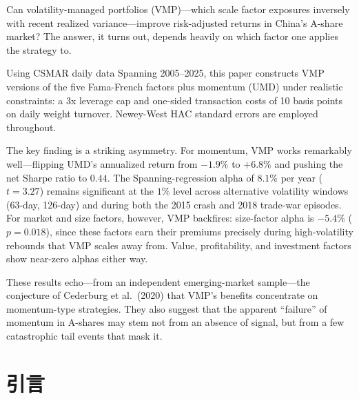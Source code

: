 \documentclass[
    decl-page,
    oneside,
  ]{njuthesis}
\begin{document}
\begin{abstract*}

Can volatility-managed portfolios (VMP)---which scale factor exposures inversely with recent realized variance---improve risk-adjusted returns in China's A-share market? The answer, it turns out, depends heavily on which factor one applies the strategy to.

Using CSMAR daily data Spanning 2005--2025, this paper constructs VMP versions of the five Fama-French factors plus momentum (UMD) under realistic constraints: a 3x leverage cap and one-sided transaction costs of 10 basis points on daily weight turnover. Newey-West HAC standard errors are employed throughout.

The key finding is a striking asymmetry. For momentum, VMP works remarkably well---flipping UMD's annualized return from $-1.9\%$ to $+6.8\%$ and pushing the net Sharpe ratio to $0.44$. The Spanning-regression alpha of $8.1\%$ per year ($t = 3.27$) remains significant at the $1\%$ level across alternative volatility windows (63-day, 126-day) and during both the 2015 crash and 2018 trade-war episodes. For market and size factors, however, VMP backfires: size-factor alpha is $-5.4\%$ ($p = 0.018$), since these factors earn their premiums precisely during high-volatility rebounds that VMP scales away from. Value, profitability, and investment factors show near-zero alphas either way.

These results echo---from an independent emerging-market sample---the conjecture of Cederburg et al.\ (2020) that VMP's benefits concentrate on momentum-type strategies. They also suggest that the apparent ``failure'' of momentum in A-shares may stem not from an absence of signal, but from a few catastrophic tail events that mask it.

\end{abstract*}

\tableofcontents
\listoffigures
\listoftables

\mainmatter

\chapter{引言}
\end{document}

